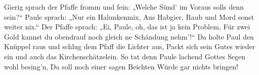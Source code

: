 \begin{guitar}
	 
	
	Gierig sprach der Pfaffe fromm und fein:
	„Welche Sünd' im Voraus solls denn sein?“
	Paule sprach: „Nur ein Halunkenmix,
	Aus Habgier, Raub und Mord sonst weiter nix.“
	Der Pfaffe sprach: „Ei, Paule, oh, das ist ja kein Problem,
	Für zwei Gold kannst du obendrauf noch gleich ne Schändung nehm'!“
	Da holte Paul den Knüppel raus und schlug dem Pfaff die Lichter aus,
	Packt sich sein Gutes wieder ein und auch das Kirchenschätzelein.
	So tat denn Paule lachend Gottes
	Segen wohl besing'n,
	Da soll noch einer sagen Beichten 
	Würde gar nichts bringen!
	
	 
	
\end{guitar}